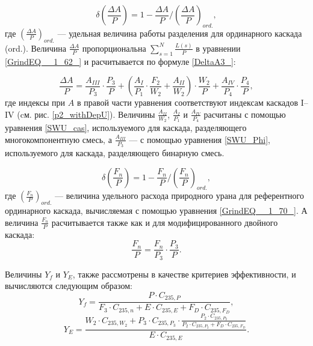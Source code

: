 \begin{equation} \label{DeltaA3} 
    \delta(\frac{\Delta A}{P})=1-\frac{\Delta A}{P}/(\frac{\Delta A}{P})_{ord.},
\end{equation}
где $(\frac{\Delta A}{P})_{ord.}$ --- удельная величина работы разделения для ординарного каскада (ord.). Величина $\frac{\Delta A}{P}$ пропорциональна $\sum _{s=1}^{N}\frac{L(s)}{P}$ в уравнении \ref{GrindEQ__1_62_} и расчитывается по формуле \ref{DeltaA3_}:

\begin{equation} \label{DeltaA3_} 
\frac{\Delta A}{P} = \frac{A_{III}}{P_3} \cdot \frac{P_3}{P}+(\frac{A_I}{P_1} \cdot \frac{F_2}{W_2}+\frac{A_{II}}{W_2}) \cdot \frac{W_2}{P} + \frac{A_{IV}}{P_4} \cdot \frac{P_4}{P},
\end{equation}
где индексы при $A$ в правой части уравнения соответствуют индексам каскадов I--IV (cм. рис. \ref{p2_withDepU}). Величины $\frac{A_{II}}{W_2}$, $\frac{A_I}{P_1}$ и $\frac{A_{IV}}{P_4}$ расчитаны с помощью уравнения \ref{SWU_cas}, используемого для каскада, разделяющего многокомпонентную смесь, а $\frac{A_{III}}{P_3}$ --- с помощью уравнения \ref{SWU_Phi}, используемого для каскада, разделяющего бинарную смесь.

\begin{equation} \label{DeltaFnu3} 
\delta(\frac{F_n}{P})=1-\frac{F_n}{P}/(\frac{F_n}{P})_{ord.},
\end{equation} 
где $(\frac{F_n}{P})_{ord.}$ --- величина удельного расхода природного урана для референтного ординарного каскада, вычисляемая с помощью уравнения \ref{GrindEQ__1_70_}. А величина $\frac{F_n}{P}$ расчитывается также как и для модифицированного двойного каскада:
\begin{equation} \label{Delta_Fnu}
    \frac{F_n}{P} = \frac{F_n}{P_3} \cdot \frac{P_3}{P}.
\end{equation}

Величины $Y_f$ и $Y_{E}$, также рассмотрены в качестве критериев эффективности, и вычисляются следующим образом:
\begin{equation} \label{Rec3} 
    Y_{f} = \frac{P \cdot C_{235,P}}{F_3 \cdot C_{235,n} + E \cdot C_{235,E} + F_D \cdot C_{235,F_D}},
\end{equation} 
\begin{equation} \label{RecR3} 
    Y_{E} = \frac{W_2\cdot C_{235,W_2} + P_3 \cdot C_{235,P_3} \cdot \frac{P_2\cdot C_{235,P_2}}{P_2\cdot C_{235,P_2}+ F_D \cdot C_{235,F_D}}}{E \cdot C_{235,E}}   .     
\end{equation} 

